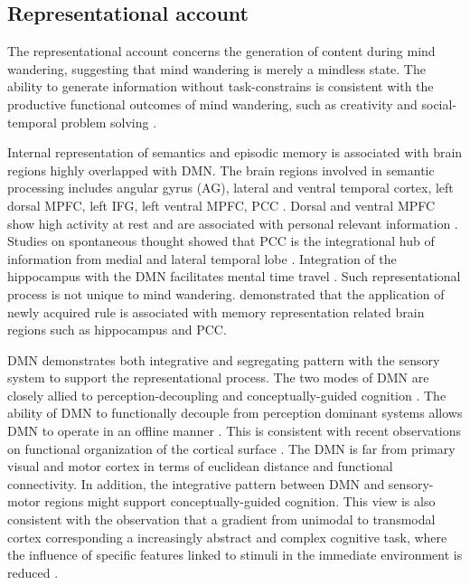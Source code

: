 \subsection{Representational account}

The representational account concerns the generation of content during mind wandering, suggesting that mind wandering is merely a mindless state. The ability to generate information without task-constrains is consistent with the productive functional outcomes of mind wandering, such as creativity \cite{Baird2012,Smeekens2016} and social-temporal problem solving \cite{RubyPlos2013,PoerioFrontiers2016,Medea2016}. 

Internal representation of semantics and episodic memory is associated with brain regions highly overlapped with DMN. The brain regions involved in semantic processing includes angular gyrus (AG), lateral and ventral temporal cortex, left dorsal MPFC, left IFG, left ventral MPFC, PCC \cite<see meta-analysis from >{Binder2009}. Dorsal and ventral MPFC show high activity at rest and are associated with personal relevant information \cite{Gusnard2001}. Studies on spontaneous thought showed that PCC is the integrational hub of information from medial and lateral temporal lobe \cite{Smallwood2016}. Integration of the hippocampus with the DMN facilitates mental time travel \cite{Karapanagiotidis2017}. Such representational process is not unique to mind wandering.  demonstrated that the application of newly acquired rule is associated with memory representation related brain regions such as hippocampus and PCC. 

DMN demonstrates both integrative and segregating pattern with the sensory system to support the representational process. The two modes of DMN are closely allied to perception-decoupling and conceptually-guided cognition \cite{Murphy2018}. The ability of DMN to functionally decouple from perception dominant systems allows DMN to operate in an offline manner \cite{Smallwood2013}. This is consistent with recent observations on functional organization of the cortical surface \cite{Margulies2016}. The DMN is far from primary visual and motor cortex in terms of euclidean distance and functional connectivity. In addition, the integrative pattern between DMN and sensory-motor regions might support conceptually-guided cognition. This view is also consistent with the observation that a gradient from unimodal to transmodal cortex \cite{Margulies2016} corresponding a increasingly abstract and complex cognitive task, where the influence of specific features linked to stimuli in the immediate environment is reduced \cite{Mesulam1998,Buckner2013,Margulies2016}.

